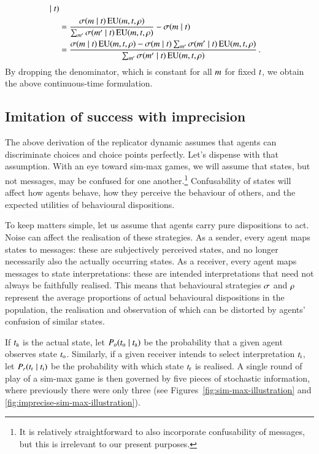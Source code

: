 \documentclass[11pt,english]{article}
\numberwithin{equation}{section}
\begin{document}
\begin{appendices}
\begin{align*}
    \mid t)\\ 
    & = \frac{\sigma(m \mid
    t)  \thinspace \mathrm{EU}(m,t,\rho)}{\sum_{m'}\sigma(m' \mid
    t)  \thinspace \mathrm{EU}(m,t,\rho)} - \sigma(m
      \mid t) \\
    & = \frac{\sigma(m \mid
    t)  \thinspace \mathrm{EU}(m,t,\rho) - \sigma(m \mid t) \sum_{m'}\sigma(m' \mid
    t)  \thinspace \mathrm{EU}(m,t,\rho) }{\sum_{m'}\sigma(m' \mid
    t)  \thinspace \mathrm{EU}(m,t,\rho)}
      \,.
  \end{align*}
By dropping the denominator, which is constant for all $m$ for fixed
$t$, we obtain the above continuous-time formulation.


\subsection{Imitation of success with imprecision}
\label{sec:imit-succ-with}

The above derivation of the replicator dynamic assumes that agents can discriminate choices and
choice points perfectly. Let's dispense with that assumption. With an eye toward sim-max games,
we will assume that states, but not messages, may be confused for one another.\footnote{It is
  relatively straightforward to also incorporate confusability of messages, but this is
  irrelevant to our present purposes.} Confusability of states will affect how agents behave,
how they perceive the behaviour of others, and the expected utilities of behavioural
dispositions.

To keep matters simple, let us assume that agents carry pure dispositions to act. Noise can
affect the realisation of these strategies. As a sender, every agent maps states to messages:
these are subjectively perceived states, and no longer necessarily also the actually occurring
states. As a receiver, every agent maps messages to state interpretations: these are intended
interpretations that need not always be faithfully realised. This means that behavioural
strategies $\sigma$ and $\rho$ represent the average proportions of actual
behavioural dispositions in the population, the realisation and observation of which can be
distorted by agents' confusion of similar states.

If $t_{\mathrm{a}}$ is the actual state, let $P_o(t_{\mathrm{o}} \mid t_{\mathrm{a}})$ be the
probability that a given agent observes state $t_{\mathrm{o}}$. Similarly, if a given receiver
intends to select interpretation $t_{\mathrm{i}}$, let $P_r(t_{\mathrm{r}} \mid t_{\mathrm{i}})$ be
the probability with which state $t_{\mathrm{r}}$ is realised. A single round of play of a sim-max
game is then governed by five pieces of stochastic information, where previously there were
only three (see Figures~\ref{fig:sim-max-illustration} and
\ref{fig:imprecise-sim-max-illustration}). 


\end{appendices}
\end{document}
